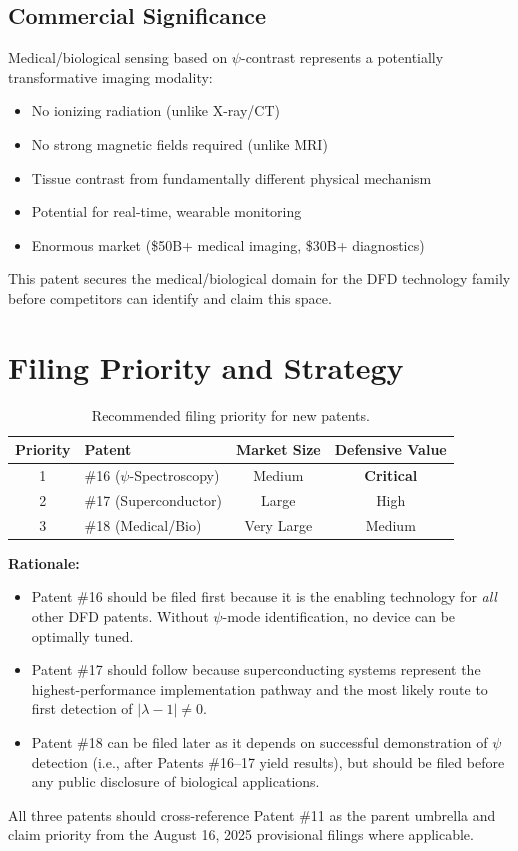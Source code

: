 \documentclass[12pt,letterpaper]{article}
\begin{document}
\subsection{Commercial Significance}

Medical/biological sensing based on $\psi$-contrast represents a
potentially transformative imaging modality:
\begin{itemize}
\item No ionizing radiation (unlike X-ray/CT)
\item No strong magnetic fields required (unlike MRI)
\item Tissue contrast from fundamentally different physical mechanism
\item Potential for real-time, wearable monitoring
\item Enormous market (\$50B+ medical imaging, \$30B+ diagnostics)
\end{itemize}

This patent secures the medical/biological domain for the DFD
technology family before competitors can identify and claim this space.

\section{Filing Priority and Strategy}

\begin{table}[h]
\centering
\caption{Recommended filing priority for new patents.}
\begin{tabular}{clcc}
\toprule
Priority & Patent & Market Size & Defensive Value \\
\midrule
1 & \#16 ($\psi$-Spectroscopy) & Medium & \textbf{Critical} \\
2 & \#17 (Superconductor) & Large & High \\
3 & \#18 (Medical/Bio) & Very Large & Medium \\
\bottomrule
\end{tabular}
\end{table}

\textbf{Rationale:}
\begin{itemize}
\item Patent \#16 should be filed first because it is the enabling
technology for \emph{all} other DFD patents. Without $\psi$-mode
identification, no device can be optimally tuned.
\item Patent \#17 should follow because superconducting systems
represent the highest-performance implementation pathway and the
most likely route to first detection of $|\lambda-1| \neq 0$.
\item Patent \#18 can be filed later as it depends on successful
demonstration of $\psi$ detection (i.e., after Patents \#16--17
yield results), but should be filed before any public disclosure
of biological applications.
\end{itemize}

All three patents should cross-reference Patent \#11 as the parent
umbrella and claim priority from the August 16, 2025 provisional
filings where applicable.
\end{document}
